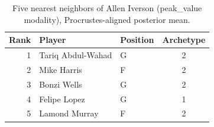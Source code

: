 \begin{table}[htbp]
  \centering\small
  \begin{tabular}{rllc}
    \toprule
    Rank & Player & Position & Archetype \\
    \midrule
    1 & Tariq Abdul-Wahad & G & 2 \\
    2 & Mike Harris & F & 2 \\
    3 & Bonzi Wells & G & 2 \\
    4 & Felipe Lopez & G & 1 \\
    5 & Lamond Murray & F & 2 \\
    \bottomrule
  \end{tabular}
  \caption{Five nearest neighbors of Allen Iverson (peak_value modality), Procrustes-aligned posterior mean.}
  \label{tab:Allen_Iverson_neighbors_peak_value}
\end{table}


